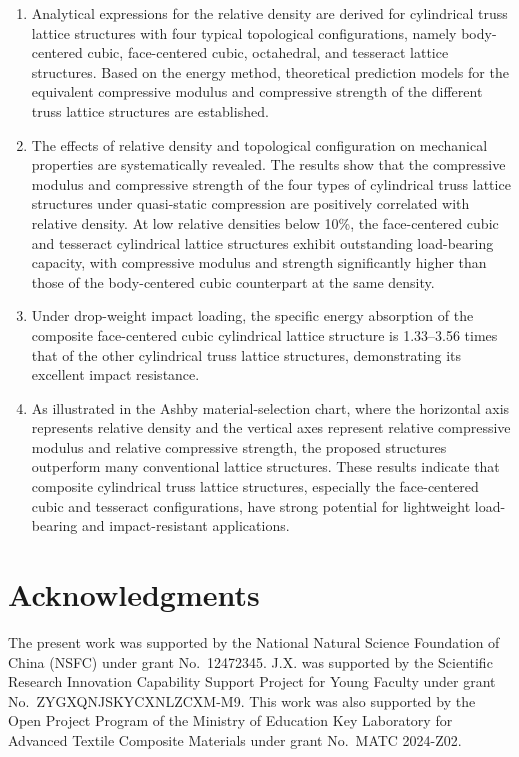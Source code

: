 \documentclass[12pt,a4paper]{article}
\begin{document}
\begin{enumerate}[label=(\arabic*)]
	\item Analytical expressions for the relative density are derived for cylindrical truss lattice structures with four typical topological configurations, namely body-centered cubic, face-centered cubic, octahedral, and tesseract lattice structures. Based on the energy method, theoretical prediction models for the equivalent compressive modulus and compressive strength of the different truss lattice structures are established.
	
	\item The effects of relative density and topological configuration on mechanical properties are systematically revealed. The results show that the compressive modulus and compressive strength of the four types of cylindrical truss lattice structures under quasi-static compression are positively correlated with relative density. At low relative densities below 10\%, the face-centered cubic and tesseract cylindrical lattice structures exhibit outstanding load-bearing capacity, with compressive modulus and strength significantly higher than those of the body-centered cubic counterpart at the same density.
	
	\item Under drop-weight impact loading, the specific energy absorption of the composite face-centered cubic cylindrical lattice structure is 1.33--3.56 times that of the other cylindrical truss lattice structures, demonstrating its excellent impact resistance.
	
	\item As illustrated in the Ashby material-selection chart, where the horizontal axis represents relative density and the vertical axes represent relative compressive modulus and relative compressive strength, the proposed structures outperform many conventional lattice structures. These results indicate that composite cylindrical truss lattice structures, especially the face-centered cubic and tesseract configurations, have strong potential for lightweight load-bearing and impact-resistant applications.
\end{enumerate}

\section*{Acknowledgments}

The present work was supported by the National Natural Science Foundation of China (NSFC) under grant No.~12472345. J.X. was supported by the Scientific Research Innovation Capability Support Project for Young Faculty under grant No.~ZYGXQNJSKYCXNLZCXM-M9. This work was also supported by the Open Project Program of the Ministry of Education Key Laboratory for Advanced Textile Composite Materials under grant No.~MATC 2024-Z02.


	
	
	
	
	
\end{document}
